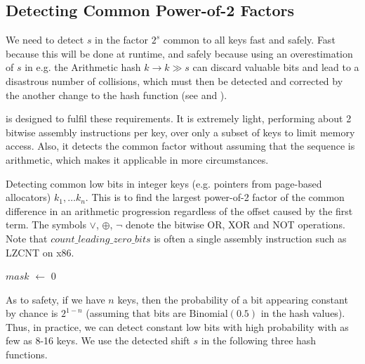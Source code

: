 \documentclass[sigconf]{acmart}
\newcommand*\Let[2]{\State #1 $\gets$ #2}
\renewcommand{\label}[1]{%
    \gdef\sfname{sf:##1}}%
\begin{document}
\subsection{Detecting Common Power-of-2 Factors}

We need to detect $s$ in the factor $2^s$ common to all keys fast and safely.
Fast because this will be done at runtime, and safely because using an overestimation of $s$ in e.g. the Arithmetic hash $k \rightarrow k \gg s$ can discard valuable bits and lead to a disastrous number of collisions, which must then be detected and corrected by the another change to the hash function (see  and ).

 is designed to fulfil these requirements.
It is extremely light, performing about 2 bitwise assembly instructions per key, over only a subset of keys to limit memory access.
Also, it detects the common factor without assuming that the sequence is arithmetic, which makes it applicable in more circumstances.

\begin{algorithm}[t]
  \caption{\small Detecting common low bits in integer keys (e.g. pointers from page-based allocators) $k_1, \dots k_n$.
This is to find the largest power-of-2 factor of the common difference in an arithmetic progression regardless of the offset caused by the first term.
The symbols $\lor$, $\oplus$, $\lnot$ denote the bitwise OR, XOR and NOT operations.
Note that $\mathit{count\_leading\_zero\_bits}$ is often a single assembly instruction such as LZCNT on x86.}
  \label{alg:detect-shift}
  \begin{algorithmic}[1]
      \Let{$\mathit{mask}$}{$0$}
      \EndFor
      \State{}
    \EndFunction
  \end{algorithmic}
\end{algorithm}

As to safety, if we have $n$ keys, then the probability of a bit appearing constant by chance is $2^{1-n}$ (assuming that bits are $\text{Binomial}(0.5)$ in the hash values).
Thus, in practice, we can detect constant low bits with high probability with as few as 8-16 keys.
We use the detected shift $s$ in the following three hash functions.
\end{document}

